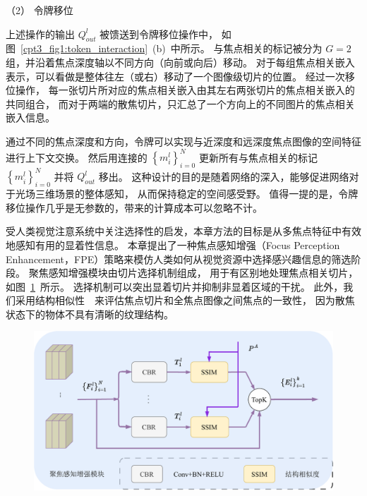 （2）
令牌移位




上述操作的输出 $ Q_{out}^{l} $ 被馈送到令牌移位操作中，
如图~\ref{cpt3_fig1:token_interaction}~(b)~中所示。 
与焦点相关的标记被分为 $G = 2$ 组，并沿着焦点深度轴以不同方向（向前或向后）移动。 
对于每组焦点相关嵌入表示，可以看做是整体往左（或右）移动了一个图像级切片的位置。
经过一次移位操作，
每一张切片所对应的焦点相关嵌入由其左右两张切片的焦点相关嵌入的共同组合，
而对于两端的散焦切片，只汇总了一个方向上的不同图片的焦点相关嵌入信息。




通过不同的焦点深度和方向，令牌可以实现与近深度和远深度焦点图像的空间特征进行上下文交换。 
然后用连接的 $ \left \{ m_{i}^{l} \right \}_{i=0}^{N} $ 更新所有与焦点相关的标记  $ \left \{ m_{i}^{l} \right \}_{i=0}^{N} $ 并将 
$ Q_{out}^{l} $ 移出。 
%
%
%
%
%
%
这种设计的目的是随着网络的深入，能够促进网络对于光场三维场景的整体感知，
从而保持稳定的空间感受野。 
值得一提的是，令牌移位操作几乎是无参数的，带来的计算成本可以忽略不计。










受人类视觉注意系统中关注选择性的启发，本章方法的目标是从多焦点特征中有效地感知有用的显着性信息。 
本章提出了一种焦点感知增强（Focus Perception Enhancement，FPE）策略来模仿人类如何从视觉资源中选择感兴趣信息的筛选阶段。 
聚焦感知增强模块由切片选择机制组成，
用于有区别地处理焦点相关切片，
如图~\ref{cpt3_fig1:fpe}~所示。
选择机制可以突出显着切片并抑制非显着区域的干扰。 
此外，我们采用结构相似性~\cite{wang2003multiscale}~来评估焦点切片和全焦点图像之间焦点的一致性，
因为散焦状态下的物体不具有清晰的纹理结构。 
%
%
%
%
\begin{figure}[!ht]
	\centering
	\includegraphics[width=0.90\linewidth]{figures/chapter3/fpe}
	\label{cpt3_fig1:fpe}
\end{figure}



